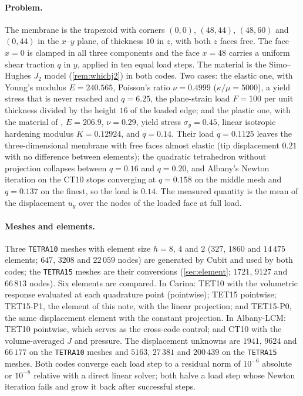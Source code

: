 \documentclass{article}
\newcommand{\code}[1]{\texttt{#1}}
\theoremstyle{definition}
\theoremstyle{plain}
\begin{document}
\paragraph{Problem.} The membrane is the trapezoid with corners $(0, 0)$,
$(48, 44)$, $(48, 60)$ and $(0, 44)$ in the $x$--$y$ plane, of thickness
$10$ in $z$, with both $z$ faces free. The face $x = 0$ is clamped in all
three components and the face $x = 48$ carries a uniform shear traction $q$
in $y$, applied in ten equal load steps. The material is the Simo--Hughes
$J_2$ model (\cref{rem:whichj2}) in both codes. Two cases: the
elastic one, with Young's modulus $E = 240.565$, Poisson's ratio $\nu =
0.4999$ ($\kappa/\mu = 5000$), a yield stress that is never reached and
$q = 6.25$, the plane-strain load $F = 100$ per unit thickness divided by
the height $16$ of the loaded edge; and the plastic one, with the material
of \textcite{SimoArmero:1992}, $E = 206.9$, $\nu = 0.29$, yield stress
$\sigma_y = 0.45$, linear isotropic hardening modulus $K = 0.12924$, and
$q = 0.14$. Their load $q = 0.1125$ leaves the three-dimensional membrane
with free faces almost elastic (tip displacement $0.21$ with no difference
between elements); the quadratic tetrahedron without projection collapses
between $q = 0.16$ and $q = 0.20$, and Albany's Newton iteration on the
CT10 stops converging at $q = 0.158$ on the middle mesh
and $q = 0.137$ on the finest, so the load is $0.14$. The measured quantity
is the mean of the displacement $u_y$ over the nodes of the loaded face at
full load.

\paragraph{Meshes and elements.} Three \code{TETRA10} meshes with element
size $h = 8$, $4$ and $2$ ($327$, $1860$ and $14\,475$ elements; $647$,
$3208$ and $22\,059$ nodes) are generated by Cubit and used by both codes;
the \code{TETRA15} meshes are their conversions (\cref{sec:element};
$1721$, $9127$ and $66\,813$ nodes). Six elements are compared. In
Carina: TET10 with the volumetric response evaluated at each
quadrature point (pointwise); TET15 pointwise; TET15-P1, the element of
this note, with the linear projection; and TET15-P0, the same displacement
element with the constant projection. In Albany-LCM: TET10 pointwise,
which serves as the cross-code control; and CT10 with
the volume-averaged $J$ and pressure. The displacement unknowns are $1941$,
$9624$ and $66\,177$ on the \code{TETRA10} meshes and $5163$, $27\,381$ and
$200\,439$ on the \code{TETRA15} meshes. Both codes converge each load step
to a residual norm of $10^{-6}$ absolute or $10^{-8}$ relative with a
direct linear solver; both halve a load step whose Newton iteration fails
and grow it back after successful steps.
\end{document}
